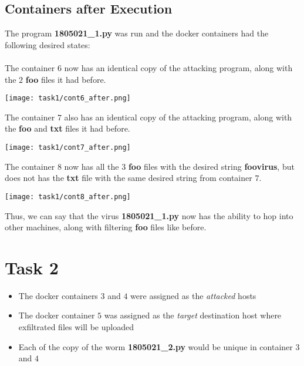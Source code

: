 \documentclass{article}
\begin{document}
\subsection{Containers after Execution}
The program \textbf{1805021\_1.py} was run and the docker containers had the following desired states:\\\\

The container $6$ now has an identical copy of the attacking program, along with the $2$ \textbf{foo} files it had before. 
\begin{center}
    \texttt{[image: task1/cont6\_after.png]}
\end{center}

The container $7$ also has an identical copy of the attacking program, along with the \textbf{foo} and \textbf{txt} files it had before. 
\begin{center}
    \texttt{[image: task1/cont7\_after.png]}
\end{center}

The container $8$ now has all the $3$ \textbf{foo} files with the desired string \textbf{foovirus}, but does not has the \textbf{txt} file with the same desired string from container $7$.
\begin{center}
    \texttt{[image: task1/cont8\_after.png]}
\end{center}

Thus, we can say that the virus \textbf{1805021\_1.py} now has the ability to hop into other machines, along with filtering \textbf{foo} files like before.


 \section{Task 2}
 \begin{itemize}
     \item The docker containers $3$ and $4$ were assigned as the \textit{attacked} hosts
     \item The docker container $5$ was assigned as the \textit{target} destination host where exfiltrated files will be uploaded
     \item Each of the copy of the worm \textbf{1805021\_2.py} would be unique in container $3$ and $4$
 \end{itemize}
\end{document}
